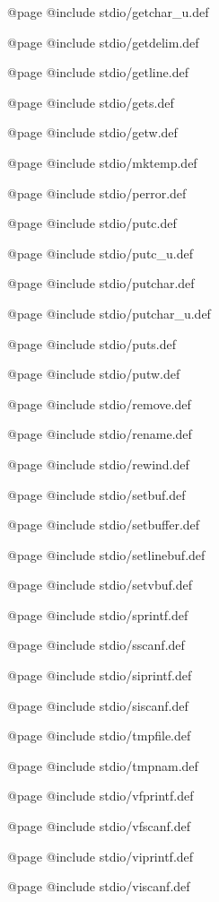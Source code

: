 @page
@include stdio/getchar_u.def

@page
@include stdio/getdelim.def

@page
@include stdio/getline.def

@page 
@include stdio/gets.def

@page 
@include stdio/getw.def

@page
@include stdio/mktemp.def

@page
@include stdio/perror.def

@page
@include stdio/putc.def

@page
@include stdio/putc_u.def

@page
@include stdio/putchar.def

@page
@include stdio/putchar_u.def

@page
@include stdio/puts.def

@page 
@include stdio/putw.def

@page
@include stdio/remove.def

@page
@include stdio/rename.def

@page
@include stdio/rewind.def

@page
@include stdio/setbuf.def

@page
@include stdio/setbuffer.def

@page
@include stdio/setlinebuf.def

@page
@include stdio/setvbuf.def

@page 
@include stdio/sprintf.def

@page
@include stdio/sscanf.def

@page 
@include stdio/siprintf.def

@page 
@include stdio/siscanf.def

@page
@include stdio/tmpfile.def

@page
@include stdio/tmpnam.def

@page 
@include stdio/vfprintf.def

@page
@include stdio/vfscanf.def

@page 
@include stdio/viprintf.def

@page 
@include stdio/viscanf.def

